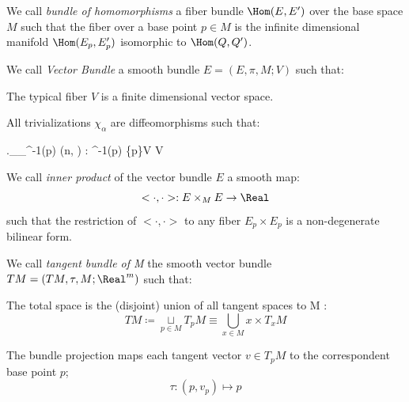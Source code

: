 \documentclass[a4paper,10pt,smallheadings]{scrartcl}
\begin{document}
			\begin{definition}
				We call \emph{bundle of homomorphisms} a fiber bundle $\Hom(E,E')$ over the base space $M$ such that the fiber over a base point $p\in M$ is the infinite dimensional manifold $\Hom(E_p,E'_p)$ isomorphic to $\Hom(Q,Q')$.
			\end{definition}

			\begin{definition}
				We call \emph{Vector Bundle} a smooth bundle $E=(E,\pi,M;V)$ such that:
				\begin{compactitemize}
					\item The typical fiber $V$ is a finite dimensional vector space.
					\item All trivializations $\chi_{\alpha} $ are diffeomorphisms such that:
						\begin{compactdisplaymath}
							\left.\chi_{\alpha}\right\vert_{\pi^{-1}(p)} \in {}(n, )
							\quad : \; \pi^{-1}(p) \rightarrow \{p\}\times V \simeq V
						\end{compactdisplaymath}
				\end{compactitemize}
			\end{definition}

			\begin{definition}
				We call \emph{inner product} of the vector bundle $E$ a smooth map:
				\begin{displaymath}
					<\cdot,\cdot> : E \times_M E \rightarrow \Real
				\end{displaymath}
				such that the restriction of $<\cdot,\cdot>$ to any fiber $E_p\times E_p$ is a non-degenerate bilinear form.
			\end{definition}
			
			\begin{definition}
				We call \emph{tangent bundle of M} the smooth vector bundle $TM=(TM,\tau,M;\Real^m)$ such that:
				\begin{compactitemize}
					\item The total space is the (disjoint) union of all tangent spaces to M :
						$$TM \coloneqq \underset{p \in M}{\sqcup} T_pM  \equiv \bigcup_{x\in M} {x}\times T_x M$$
					\item The bundle projection maps each tangent vector $v\in  T_pM$ to the correspondent base point  $p$;
						$$\tau : (p,v_p) \mapsto p $$
				\end{compactitemize}
			\end{definition}
\end{document}
